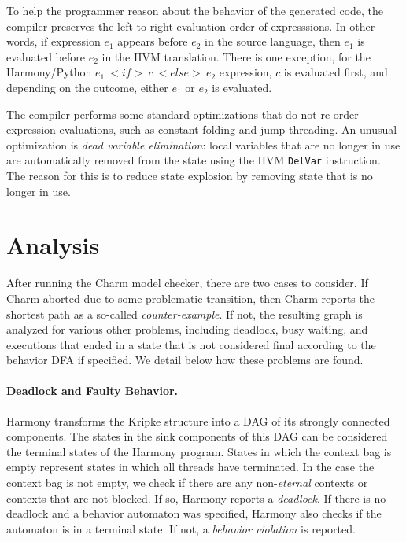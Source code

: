 \documentclass[twocolumn]{article}
\begin{document}
To help the programmer reason about the behavior of the generated code,
the compiler preserves the left-to-right evaluation order of
expresssions.  In other words, if expression $e_1$ appears before
$e_2$ in the source language, then $e_1$ is evaluated before $e_2$
in the HVM translation.  There is one exception, for the Harmony/Python
$e_1~<{if}>~c~<{else}>~e_2$ expression, $c$ is evaluated first, and
depending on the outcome, either $e_1$ or $e_2$ is evaluated.

The compiler performs some standard optimizations that do not re-order
expression evaluations, such as constant folding and jump threading.
An unusual optimization is \emph{dead variable elimination}:
local variables that are no longer in use are automatically removed
from the state using the HVM \texttt{DelVar} instruction.  The reason
for this is to reduce state explosion by removing state that is no
longer in use.

\section{Analysis}

After running the Charm model checker, there are two cases to
consider.  If Charm aborted due to some problematic transition,
then Charm reports the shortest path as a so-called \emph{counter-example}.
If not, the resulting graph is analyzed for various other problems,
including deadlock, busy waiting, and executions
that ended in a state that is not considered final according to the
behavior DFA if specified.  We detail below how these problems are
found.

\paragraph{Deadlock and Faulty Behavior.}

Harmony transforms the Kripke structure into a DAG of its strongly
connected components.  The states in the sink components of this
DAG can be considered the terminal states of the Harmony program.
States in which the context bag is empty represent states in which
all threads have terminated.  In the case the context bag is not
empty, we check if there are any non-\emph{eternal} contexts or
contexts that are not blocked.
If so, Harmony reports a \emph{deadlock}. If there
is no deadlock and a behavior automaton was specified, Harmony also
checks if the automaton is in a terminal state.  If not, a
\emph{behavior violation} is reported.
\end{document}
